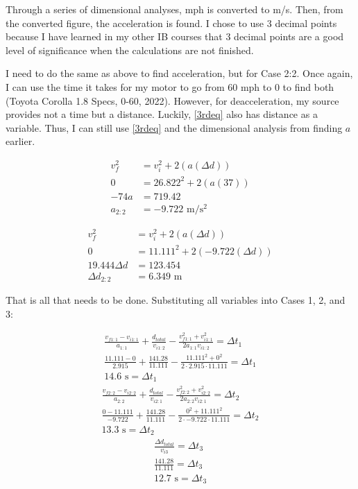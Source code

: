 \documentclass[11pt]{article}
\begin{document}
Through a series of dimensional analyses, mph is converted to m/s. Then, from the converted figure, the acceleration is found. I chose to use 3 decimal points because I have learned in my other IB courses that 3 decimal points are a good level of significance when the calculations are not finished. 

I need to do the same as above to find acceleration, but for Case 2:2. Once again, I can use the time it takes for my motor to go from 60 mph to 0 to find both (Toyota Corolla 1.8 Specs, 0-60, 2022). However, for deacceleration, my source provides not a time but a distance. Luckily, \eqref{3rdeq} also has distance as a variable. Thus, I can still use \eqref{3rdeq} and the dimensional analysis from finding ${a}$ earlier.

\vspace{-0.75cm}

\begin{align*}
    {v^2_f} &= {v^2_i} + 2({a}(\Delta d)) \\
    0 &= 26.822^2 + 2({a}(37)) \\
    -74{a} &= 719.42 \\
    {a_{2:2}} &= -9.722 \text{ m/s$^2$}
\end{align*}

\vspace{-0.7cm}

\begin{align*}
    {v^2_f} &= {v^2_i} + 2({a}(\Delta d)) \\
    0 &= 11.111^2 + 2(-9.722(\Delta d)) \\
    19.444{\Delta d} &= 123.454 \\
    {\Delta d_{2:2}} &= 6.349 \text{ m}
\end{align*}

That is all that needs to be done. Substituting all variables into Cases 1, 2, and 3:


\begin{align*}
    \frac{v_{f1:1} - v_{i1:1}}{a_{1:1}} + \frac{d_{total}}{v_{i1:2}} - \frac{v_{f1:1}^2 + v_{i1:1}^2}{2a_{1:1}v_{i1:2}} = \Delta t_1 \\
    \frac{11.111 - 0}{2.915} + \frac{141.28}{11.111} - \frac{11.111^2 + 0^2}{2 \cdot 2.915 \cdot 11.111} = \Delta t_1 \\
    14.6 \text{ s} = \Delta t_1
\end{align*}
\vspace{-0.4cm}
\begin{align*}
    \frac{v_{f2:2} - v_{i2:2}}{a_{2:2}} + \frac{d_{total}}{v_{i2:1}} - \frac{v_{f2:2}^2 + v_{i2:2}^2}{2a_{2:2}v_{i2:1}} = \Delta t_2 \\
    \frac{0 - 11.111}{-9.722} + \frac{141.28}{11.111} - \frac{0^2 + 11.111^2}{2 \cdot -9.722 \cdot 11.111} = \Delta t_2 \\
    13.3 \text{ s} = \Delta t_2
\end{align*}
\vspace{-0.4cm}
\begin{align*}
    \frac{\Delta d_{total}}{v_{i3}} = \Delta t_3 \\
    \frac{141.28}{11.111} = \Delta t_3 \\
     12.7 \text{ s} = \Delta t_3
\end{align*}
\end{document}
